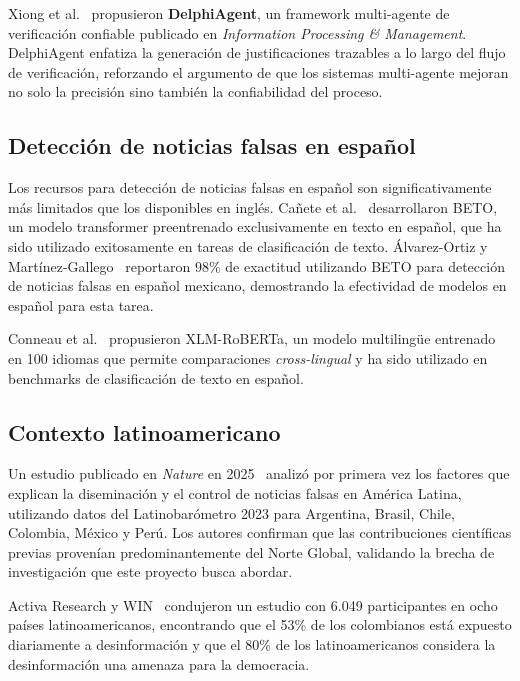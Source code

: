 Xiong et al.~\cite{Xiong2025} propusieron \textbf{DelphiAgent}, un framework multi-agente de verificación confiable publicado en \textit{Information Processing \& Management}. DelphiAgent enfatiza la generación de justificaciones trazables a lo largo del flujo de verificación, reforzando el argumento de que los sistemas multi-agente mejoran no solo la precisión sino también la confiabilidad del proceso.

\subsection{Detección de noticias falsas en español}

Los recursos para detección de noticias falsas en español son significativamente más limitados que los disponibles en inglés. Cañete et al.~\cite{Canete2020} desarrollaron BETO, un modelo transformer preentrenado exclusivamente en texto en español, que ha sido utilizado exitosamente en tareas de clasificación de texto. Álvarez-Ortiz y Martínez-Gallego~\cite{AlvarezOrtiz2024} reportaron 98\% de exactitud utilizando BETO para detección de noticias falsas en español mexicano, demostrando la efectividad de modelos en español para esta tarea.

Conneau et al.~\cite{Conneau2020} propusieron XLM-RoBERTa, un modelo multilingüe entrenado en 100 idiomas que permite comparaciones \textit{cross-lingual} y ha sido utilizado en benchmarks de clasificación de texto en español.

\subsection{Contexto latinoamericano}

Un estudio publicado en \textit{Nature} en 2025~\cite{Nature2025} analizó por primera vez los factores que explican la diseminación y el control de noticias falsas en América Latina, utilizando datos del Latinobarómetro 2023 para Argentina, Brasil, Chile, Colombia, México y Perú. Los autores confirman que las contribuciones científicas previas provenían predominantemente del Norte Global, validando la brecha de investigación que este proyecto busca abordar.

Activa Research y WIN~\cite{ActivaResearch2022} condujeron un estudio con 6.049 participantes en ocho países latinoamericanos, encontrando que el 53\% de los colombianos está expuesto diariamente a desinformación y que el 80\% de los latinoamericanos considera la desinformación una amenaza para la democracia.
